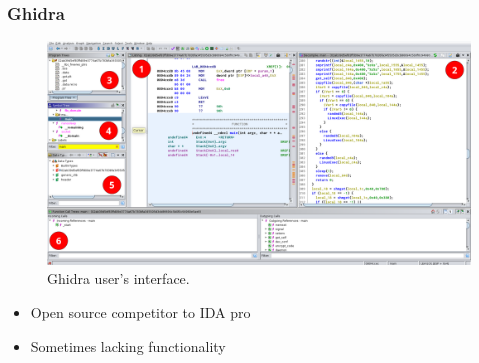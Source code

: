 \documentclass[10pt,xcolor=pdflatex]{beamer}
\begin{document}
\begin{frame}\frametitle{Ghidra}

    \begin{figure}
      \centering
      \includegraphics[width=.8\textwidth]{../images/ghidra.png}
      \caption{Ghidra user's interface.}
    \end{figure}
    \begin{itemize}
        \item Open source competitor to IDA pro
        \item Sometimes lacking functionality
    \end{itemize}

\end{frame}
\end{document}
